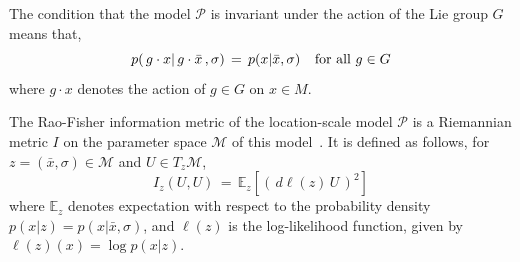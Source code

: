 \documentclass{svmult}
\begin{document}
The condition that the model $\mathcal{P}$ is invariant under the action of the Lie group $G$ means that, 
\begin{equation} \label{eq:invariance}
  p(\,g\cdot x|\,g\cdot\bar{x}\,,\sigma) \,=\,p(x|\bar{x},\sigma) \hspace{0.25cm} \text{ for all } g \in G
\end{equation}
where $g\cdot x$ denotes the action of $g \in G$ on $x \in M$. 

The Rao-Fisher information metric of the location-scale model $\mathcal{P}$ is a Riemannian metric $I$ on the parameter space $\mathcal{M}$ of this model~\cite{amari}.  It is defined as follows, for $z =(\bar{x},\sigma) \in \mathcal{M}$ and $U\in T_z\mathcal{M}$,
\begin{equation} \label{eq:rao}
  I_z(U,U) \,=\, \mathbb{E}_z\left[\left( \,d\ell(z)\,U\,\right)^2 \right]
\end{equation}
where $\mathbb{E}_z$ denotes expectation with respect to the probability density $p(x|z) = p(x|\bar{x},\sigma)$, and $\ell(z)$ is the log-likelihood function,
given by $\ell(z)(x) = \log p(x|z)$.  
\end{document}
